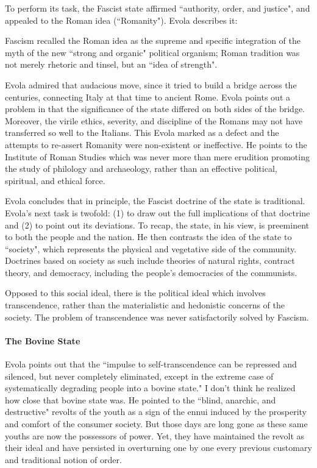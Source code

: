 To perform its task, the Fascist state affirmed ``authority, order, and justice", and appealed to the Roman idea (``Romanity"). Evola describes it:

\begin{quotex}
Fascism recalled the Roman idea as the supreme and specific integration of the myth of the new ``strong and organic" political organism; Roman tradition was not merely rhetoric and tinsel, but an ``idea of strength". 

\end{quotex}
Evola admired that audacious move, since it tried to build a bridge across the centuries, connecting Italy at that time to ancient Rome. Evola points out a problem in that the significance of the state differed on both sides of the bridge. Moreover, the virile ethics, severity, and discipline of the Romans may not have transferred so well to the Italians. This Evola marked as a defect and the attempts to re-assert Romanity were non-existent or ineffective. He points to the Institute of Roman Studies which was never more than mere erudition promoting the study of philology and archaeology, rather than an effective political, spiritual, and ethical force.

Evola concludes that in principle, the Fascist doctrine of the state is traditional. Evola's next task is twofold: (1) to draw out the full implications of that doctrine and (2) to point out its deviations. To recap, the state, in his view, is preeminent to both the people and the nation. He then contrasts the idea of the state to ``society", which represents the physical and vegetative side of the community. Doctrines based on society as such include theories of natural rights, contract theory, and democracy, including the people's democracies of the communists.

Opposed to this social ideal, there is the political ideal which involves transcendence, rather than the materialistic and hedonistic concerns of the society. The problem of transcendence was never satisfactorily solved by Fascism.

\paragraph{The Bovine State}
Evola points out that the ``impulse to self-transcendence can be repressed and silenced, but never completely eliminated, except in the extreme case of systematically degrading people into a bovine state." I don't think he realized how close that bovine state was. He pointed to the ``blind, anarchic, and destructive" revolts of the youth as a sign of the ennui induced by the prosperity and comfort of the consumer society. But those days are long gone as these same youths are now the possessors of power. Yet, they have maintained the revolt as their ideal and have persisted in overturning one by one every previous customary and traditional notion of order.

